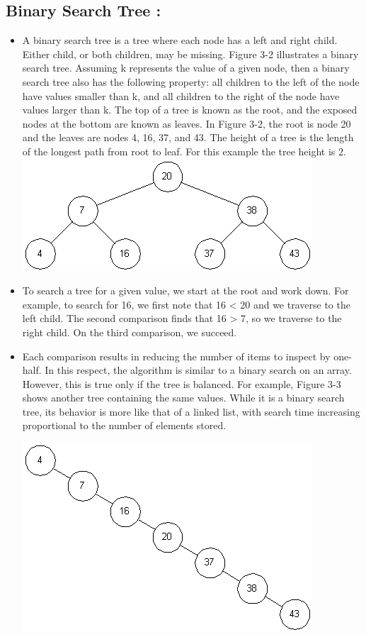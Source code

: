 \documentclass[10pt,a4paper]{article}
\begin{document}
\subsection{Binary Search Tree : }
	\begin{itemize}
		\item A binary search tree is a tree where each node has a left and right child. Either child, or both children, may be missing. Figure 3-2 illustrates a binary search tree. Assuming k represents the value of a given node, then a binary search tree also has the following property: all children to the left of the node have values smaller than k, and all children to the right of the node have values larger than k. The top of a tree is known as the root, and the exposed nodes at the bottom are known as leaves. In Figure 3-2, the root is node 20 and the leaves are nodes 4, 16, 37, and 43. The height of a tree is the length of the longest path from root to leaf. For this example the tree height is 2. 
	\includegraphics[scale = 0.8]{A1_01}

    	\item To search a tree for a given value, we start at the root and work down. For example, to search for 16, we first note that 16 < 20 and we traverse to the left child. The second comparison finds that 16 > 7, so we traverse to the right child. On the third comparison, we succeed. 
        \item Each comparison results in reducing the number of items to inspect by one-half. In this respect, the algorithm is similar to a binary search on an array. However, this is true only if the tree is balanced. For example, Figure 3-3 shows another tree containing the same values. While it is a binary search tree, its behavior is more like that of a linked list, with search time increasing proportional to the number of elements stored. 
   	   	
			\includegraphics[scale = 0.8]{A1_02}
		

\end{itemize}
\end{document}
